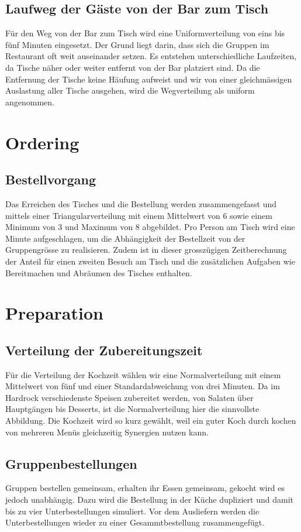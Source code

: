 \documentclass[ngerman,a4paper,12pt]{scrreprt}
\begin{document}
	
		\subsection{Laufweg der Gäste von der Bar zum Tisch}
			Für den Weg von der Bar zum Tisch wird eine Uniformverteilung von eins bis fünf Minuten eingesetzt. Der Grund liegt darin, dass sich die Gruppen im Restaurant oft weit auseinander setzen. Es entstehen unterschiedliche Laufzeiten, da Tische näher oder weiter entfernt von der Bar platziert sind. Da die Entfernung der Tische keine Häufung aufweist und wir von einer gleichmässigen Auslastung aller Tische ausgehen, wird die Wegverteilung als uniform angenommen.
	
	
	\section{Ordering}			
		\subsection{Bestellvorgang}
			Das Erreichen des Tisches und die Bestellung werden zusammengefasst und mittels einer Triangularverteilung mit einem Mittelwert von 6 sowie einem Minimum von 3 und Maximum von 8 abgebildet. Pro Person am Tisch wird eine Minute aufgeschlagen, um die Abhängigkeit der Bestellzeit von der Gruppengrösse zu realisieren. Zudem ist in dieser grosszügigen Zeitberechnung der Anteil für einen zweiten Besuch am Tisch und die zusätzlichen Aufgaben wie Bereitmachen und Abräumen des Tisches enthalten.
	
	
	\section{Preparation}	
		\subsection{Verteilung der Zubereitungszeit}
			Für die Verteilung der Kochzeit wählen wir eine Normalverteilung mit einem Mittelwert von fünf und einer Standardabweichung von drei Minuten. Da im Hardrock verschiedenste Speisen zubereitet werden, von Salaten über Hauptgängen bis Desserts, ist die Normalverteilung hier die sinnvollste Abbildung. Die Kochzeit wird so kurz gewählt, weil ein guter Koch durch kochen von mehreren Menüs gleichzeitig Synergien nutzen kann.
	
	
		\subsection{Gruppenbestellungen}
			Gruppen bestellen gemeinsam, erhalten ihr Essen gemeinsam, gekocht wird es jedoch unabhängig. Dazu wird die Bestellung in der Küche dupliziert und damit bis zu vier Unterbestellungen simuliert. Vor dem Ausliefern werden die Unterbestellungen wieder zu einer Gesammtbestellung zusammengefügt.
			
\end{document}
